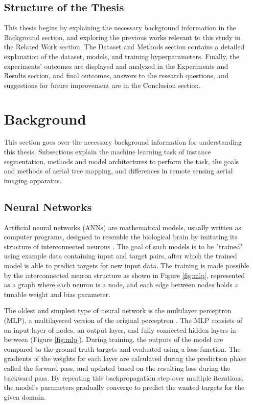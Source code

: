 \documentclass[english, 12pt, a4paper, sci, utf8, a-2b, online]{aaltothesis}
\begin{document}
\subsection{Structure of the Thesis}

This thesis begins by explaining the necessary background information in the Background section, and exploring the previous works relevant to this study in the Related Work section. The Dataset and Methods section contains a detailed explanation of the dataset, models, and training hyperparameters. Finally, the experiments' outcomes are displayed and analyzed in the Experiments and Results section, and final outcomes, answers to the research questions, and suggestions for future improvement are in the Conclusion section.

\newpage
\section{Background}

This section goes over the necessary background information for understanding this thesis. Subsections explain the machine learning task of instance segmentation, methods and model architectures to perform the task, the goals and methods of aerial tree mapping, and differences in remote sensing aerial imaging apparatus.

\subsection{Neural Networks}

Artificial neural networks (ANNs) are mathematical models, usually written as computer programs, designed to resemble the biological brain by imitating its structure of interconnected neurons \cite{ann-intro}. The goal of such models is to be "trained" using example data containing input and target pairs, after which the trained model is able to predict targets for new input data. The training is made possible by the interconnected neuron structure as shown in Figure \ref{fig:mlp}, represented as a graph where each neuron is a node, and each edge between nodes holds a tunable weight and bias parameter.
\cite{ann}

The oldest and simplest type of neural network is the multilayer perceptron (MLP), a multilayered version of the original perceptron \cite{perceptron}. The MLP consists of an input layer of nodes, an output layer, and fully connected hidden layers in-between (Figure \ref{fig:mlp}). During training, the outputs of the model are compared to the ground truth targets and evaluated using a loss function. The gradients of the weights for each layer are calculated during the prediction phase called the forward pass, and updated based on the resulting loss during the backward pass. By repeating this backpropagation step over multiple iterations, the model's parameters gradually converge to predict the wanted targets for the given domain.
\cite{ann}
\end{document}
